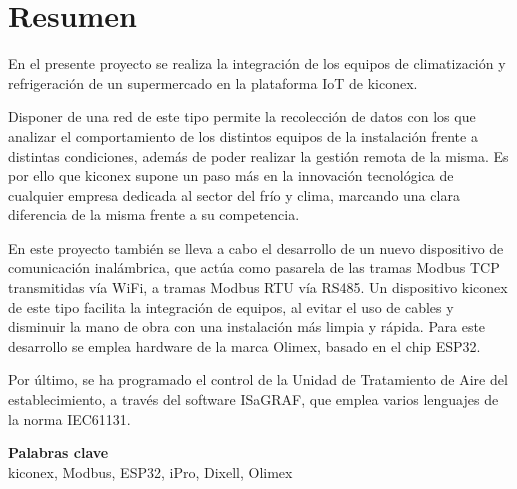 \chapter*{Resumen}

En el presente proyecto se realiza la integración de los equipos de climatización y refrigeración de un supermercado en la plataforma IoT de kiconex.

Disponer de una red de este tipo permite la recolección de datos con los que analizar el comportamiento de los distintos equipos de la instalación frente a distintas condiciones, además de poder realizar la gestión remota de la misma. Es por ello que kiconex supone un paso más en la innovación tecnológica de cualquier empresa dedicada al sector del frío y clima, marcando una clara diferencia de la misma frente a su competencia.

En este proyecto también se lleva a cabo el desarrollo de un  nuevo dispositivo de comunicación inalámbrica, que actúa como pasarela de las tramas Modbus TCP transmitidas vía WiFi, a tramas Modbus RTU vía RS485. Un dispositivo kiconex de este tipo facilita la integración de equipos, al evitar el uso de cables y disminuir la mano de obra con una instalación más limpia y rápida. Para este desarrollo se emplea hardware de la marca Olimex, basado en el chip ESP32.

Por último, se ha programado el control de la Unidad de Tratamiento de Aire del establecimiento, a través del software ISaGRAF, que emplea varios lenguajes de la norma IEC61131. 



\vspace{10mm}

\begin{center}
\textbf{\Large{Palabras clave}} \\
\vspace{10mm}
kiconex, Modbus, ESP32, iPro, Dixell, Olimex 
\end{center}
